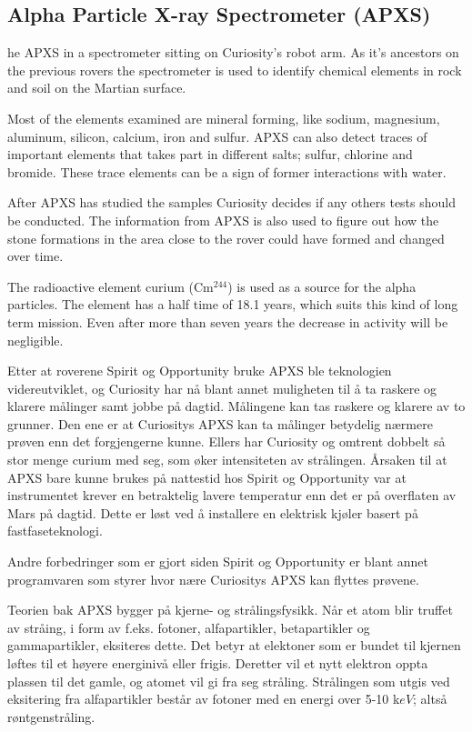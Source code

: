 \subsection*{Alpha Particle X-ray Spectrometer (APXS)}
he APXS in a spectrometer sitting on Curiosity's robot arm.
As it's ancestors on the previous rovers the spectrometer is used to identify chemical elements in rock and soil on the Martian surface.

Most of the elements examined are mineral forming, like sodium, magnesium, aluminum, silicon, calcium, iron and sulfur.
APXS can also detect traces of important elements that takes part in different salts; sulfur, chlorine and bromide.
These trace elements can be a sign of former interactions with water.

After APXS has studied the samples Curiosity decides if any others tests should be conducted.
The information from APXS is also used to figure out how the stone formations in the area close to the rover could have formed and changed over time.

The radioactive element curium (Cm$^{244}$) is used as a source for the alpha particles.
The element has a half time of 18.1 years, which suits this kind of long term mission.
Even after more than seven years the decrease in activity will be negligible.




Etter at roverene Spirit og Opportunity bruke APXS ble teknologien videreutviklet, og Curiosity har nå blant annet muligheten til å ta raskere og klarere målinger samt jobbe på dagtid.
Målingene kan tas raskere og klarere av to grunner.
Den ene er at Curiositys APXS kan ta målinger betydelig nærmere prøven enn det forgjengerne kunne.
Ellers har Curiosity og omtrent dobbelt så stor menge curium med seg, som øker intensiteten av strålingen.
Årsaken til at APXS bare kunne brukes på nattestid hos Spirit og Opportunity var at instrumentet krever en betraktelig lavere temperatur enn det er på overflaten av Mars på dagtid.
Dette er løst ved å installere en elektrisk kjøler basert på fastfaseteknologi.

Andre forbedringer som er gjort siden Spirit og Opportunity er blant annet programvaren som styrer hvor nære Curiositys APXS kan flyttes prøvene.

Teorien bak APXS bygger på kjerne- og strålingsfysikk.
Når et atom blir truffet av stråing, i form av f.eks. fotoner, alfapartikler, betapartikler og gammapartikler, eksiteres dette.
Det betyr at elektoner som er bundet til kjernen løftes til et høyere energinivå eller frigis.
Deretter vil et nytt elektron oppta plassen til det gamle, og atomet vil gi fra seg stråling.
Strålingen som utgis ved eksitering fra alfapartikler består av fotoner med en energi over 5-10 k$eV$; altså røntgenstråling.

